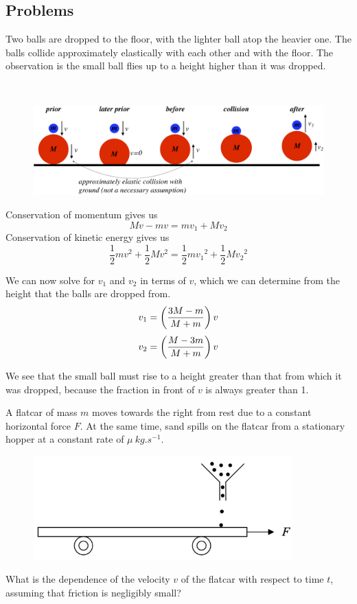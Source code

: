 \subsection{Problems}
\begin{prbm}
Two balls are dropped to the floor, with the lighter ball atop the heavier one. The balls collide approximately elastically with each other and with the floor. The observation is the small ball flies up to a height higher than it was dropped.
\end{prbm}
\begin{solution} \ {\\}
\begin{figure}[H]
    \centering
    \includegraphics[width=15cm]{images/Stacked_balls.png}
\end{figure}

Conservation of momentum gives us 
\[ Mv - mv = mv_1 + Mv_2 \]
Conservation of kinetic energy gives us 
\[ \frac{1}{2}mv^2 + \frac{1}{2}Mv^2 = \frac{1}{2}m{v_1}^2 + \frac{1}{2}M{v_2}^2 \]

We can now solve for $v_1$ and $v_2$ in terms of $v$, which we can determine from the height that the balls are dropped from.
\[ v_1=\left(\frac{3M-m}{M+m}\right)v \]
\[ v_2=\left(\frac{M-3m}{M+m}\right)v \]

We see that the small ball must rise to a height greater than that from which it was dropped, because the fraction in front of $v$ is always greater than 1.
\end{solution}
\pagebreak

\begin{prbm}
A flatcar of mass $m$ moves towards the right from rest due to a constant horizontal force $F$. At the same time, sand spills on the flatcar from a stationary hopper at a constant rate of $\mu\:\unit{kg.s^{-1}}$. 

\begin{figure}[H]
    \centering
    \includegraphics[width=10cm]{images/Sand_car.png}
\end{figure}

What is the dependence of the velocity $v$ of the flatcar with respect to time $t$, assuming that friction is negligibly small?
\end{prbm}

